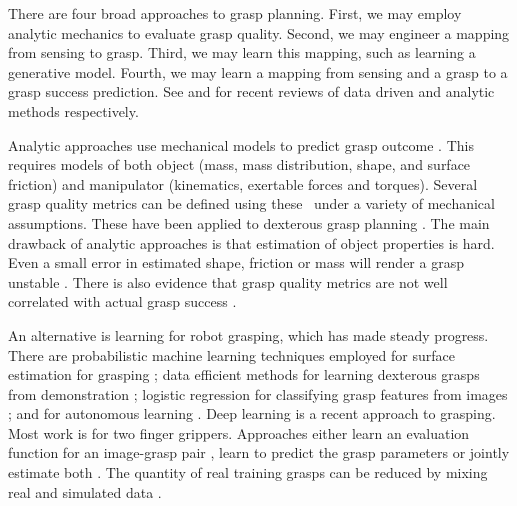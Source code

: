 There are four broad approaches to grasp planning. First, we may employ analytic mechanics to evaluate grasp quality. Second, we may engineer a mapping from sensing to grasp. Third, we may learn this mapping, such as learning a generative model. Fourth, we may learn a mapping from sensing and a grasp to a grasp success prediction. See \cite{bohg2014data} and  \cite{sahbani2012overview} for recent reviews of data driven and analytic methods respectively.

Analytic approaches use mechanical models to predict grasp outcome \cite{bicchi2000a,Liu2000,Pollard2004,miller2004}. This requires models of both object (mass, mass distribution, shape, and surface friction) and manipulator (kinematics, exertable forces and torques). Several grasp quality metrics can be defined using these~\cite{Ferrari1992,Roa2015,Shimoga1996} under a variety of mechanical assumptions. These have been applied to dexterous grasp planning \cite{Boutselis2014,Gori2014,Hang2014,Rosales2012,Saut2012,ciocarlie2009hand}. The main drawback of analytic approaches is that estimation of object properties is hard. Even a small error in estimated shape, friction or mass will render a grasp unstable \cite{zheng2005a}. There is also evidence that grasp quality metrics are not well correlated with actual grasp success \cite{bekiroglu2011b,kim2013a,goins2014a}.

An alternative is learning for robot grasping, which has made steady progress. There are probabilistic machine learning techniques employed for surface estimation for grasping \cite{dragiev2011gaussian}; data efficient methods for learning dexterous grasps from demonstration \cite{ben-amor2012a,kopicki2015ijrr,detry2012a}; logistic regression for classifying grasp features from images \cite{saxena2008a}; and for autonomous learning \cite{detry2010a}. Deep learning is a recent approach to grasping. Most work is for two finger grippers. Approaches either learn an evaluation function for an image-grasp pair \cite{levine16,lenz2015deep,gualtieri2016high,mahler2017dex,pinto2016supersizing,johns2016deep}, learn to predict the grasp parameters \cite{redmon2015real,kumra2017iros} or jointly estimate both \cite{morrison18}. The quantity of real training grasps can be reduced by mixing real and simulated data \cite{bousmalis2017using}. 


